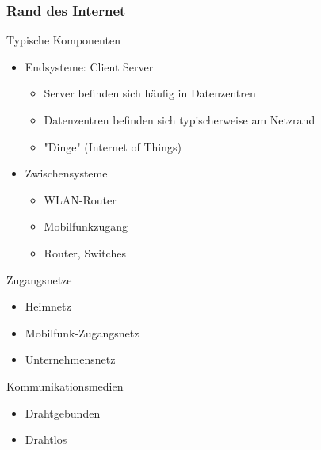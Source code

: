     \subsubsection{Rand des Internet}
      Typische Komponenten
      \begin{itemize}
        \item Endsysteme: Client Server
          \begin{itemize}
            \item Server befinden sich häufig in Datenzentren
            \item Datenzentren befinden sich typischerweise am Netzrand
            \item "Dinge" (Internet of Things)
          \end{itemize}
        \item Zwischensysteme
          \begin{itemize}
            \item WLAN-Router
            \item Mobilfunkzugang
            \item Router, Switches
          \end{itemize}
      \end{itemize}
      Zugangsnetze
      \begin{itemize}
        \item Heimnetz
        \item Mobilfunk-Zugangsnetz
        \item Unternehmensnetz
      \end{itemize}
      Kommunikationsmedien
      \begin{itemize}
        \item Drahtgebunden
        \item Drahtlos
      \end{itemize}
